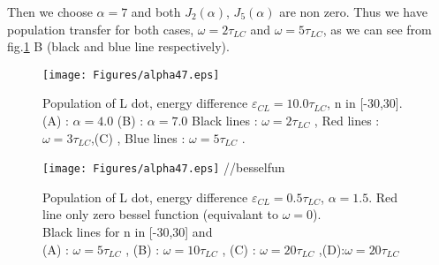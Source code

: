Then we choose $\alpha=7$ and both $J_{2}(\alpha)$, $J_{5}(\alpha)$ are non zero. Thus we have population transfer for both cases, $\omega=2\tau_{LC}$ and  $\omega=5\tau_{LC}$, as we can see from fig.\ref{fig:2.4} B (black and blue line respectively).

\begin{figure}
\centering
\texttt{[image: Figures/alpha47.eps]}
\decoRule
\caption[Far-off resonance]{Population of L dot, energy difference $\varepsilon_{CL}=10.0\tau_{LC}$, n in [-30,30]. (A) :  $\alpha=4.0$ (B) :  $\alpha=7.0$ Black lines : $\omega=2\tau_{LC}$ , Red lines : $\omega=3\tau_{LC}$,(C) , Blue lines : $\omega=5\tau_{LC}$ . }
\label{fig:2.4}
\end{figure}

\begin{figure}
\centering
\texttt{[image: Figures/alpha47.eps]} //besselfun
\decoRule
\caption[Far-off resonance]{Population of L dot, energy difference $\varepsilon_{CL}=0.5\tau_{LC}$, $\alpha=1.5$. Red line only zero bessel function (equivalant to $\omega=0$). \\Black lines for n in [-30,30] and \\ (A) : $\omega=5\tau_{LC}$ , (B) : $\omega=10\tau_{LC}$ , (C) : $\omega=20\tau_{LC}$ ,(D):$\omega=20\tau_{LC}$}
\label{fig:2.5}
\end{figure}
